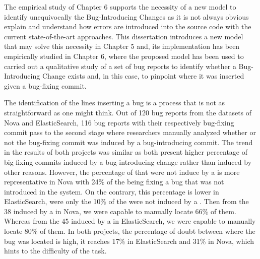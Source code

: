 \documentclass[a4paper, 12pt]{book}
\begin{document}
The empirical study of Chapter 6 supports the necessity of a new model to identify unequivocally the Bug-Introducing Changes as it is not always obvious explain and understand how errors are introduced into the source code with the current state-of-the-art approaches. This dissertation introduces a new model that may solve this necessity in Chapter 5 and, its implementation has been empirically studied in Chapter 6, where the proposed model has been used to carried out a qualitative study of a set of bug reports to identify whether a Bug-Introducing Change exists and, in this case, to pinpoint where it was inserted given a bug-fixing commit.  

The identification of the lines inserting a bug is a process that is not as straightforward as one might think. Out of 120 bug reports from the datasets of Nova and ElasticSearch, 116 bug reports with their respectively bug-fixing commit pass to the second stage where researchers manually analyzed whether or not the bug-fixing commit was induced by a bug-introducing commit. The trend in the results of both projects was similar as both present higher percentage of big-fixing commits induced by a bug-introducing change rather than induced by other reasons. However, the percentage of \BFC that were not induce by a \BIC is more representative in Nova with 24\% of the \BFC being fixing a bug that was not introduced in the system. On the contrary, this percentage is lower in ElasticSearch, were only the 10\% of the \BFC were not induced by a \BIC. Then from the 38 \BFC induced by a \BIC in Nova, we were capable to manually locate 66\% of them. Whereas from the 45 \BFC induced by a \BIC in ElasticSearch, we were capable to manually locate 80\% of them. In both projects, the percentage of doubt between where the bug was located is high, it reaches 17\% in ElasticSearch and  31\% in Nova, which hints to the difficulty of the task.
\end{document}
